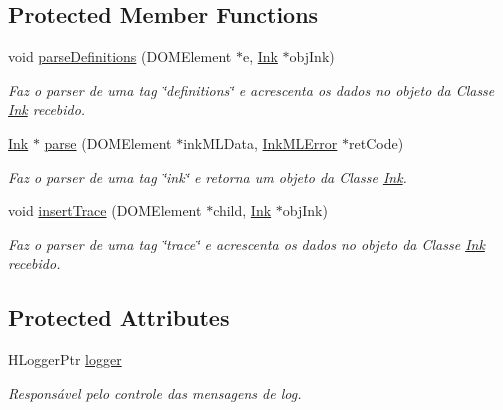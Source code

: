 \subsection*{Protected Member Functions}
\begin{DoxyCompactItemize}
\item 
void \hyperlink{classbr_1_1ufscar_1_1lince_1_1mmi_1_1ink_1_1InkMLParser_afa63df2f41822c11e28762f3c17b1b43}{parseDefinitions} (DOMElement $\ast$e, \hyperlink{classbr_1_1ufscar_1_1lince_1_1mmi_1_1ink_1_1Ink}{Ink} $\ast$objInk)
\begin{DoxyCompactList}\small\item\em Faz o parser de uma tag \char`\"{}definitions\char`\"{} e acrescenta os dados no objeto da Classe \hyperlink{classbr_1_1ufscar_1_1lince_1_1mmi_1_1ink_1_1Ink}{Ink} recebido. \item\end{DoxyCompactList}\item 
\hyperlink{classbr_1_1ufscar_1_1lince_1_1mmi_1_1ink_1_1Ink}{Ink} $\ast$ \hyperlink{classbr_1_1ufscar_1_1lince_1_1mmi_1_1ink_1_1InkMLParser_a77a83c6281e610f692254e0e2e96f956}{parse} (DOMElement $\ast$inkMLData, \hyperlink{namespacebr_1_1ufscar_1_1lince_1_1mmi_1_1ink_a682c285834346cbf7587dd58c9832fe4}{InkMLError} $\ast$retCode)
\begin{DoxyCompactList}\small\item\em Faz o parser de uma tag \char`\"{}ink\char`\"{} e retorna um objeto da Classe \hyperlink{classbr_1_1ufscar_1_1lince_1_1mmi_1_1ink_1_1Ink}{Ink}. \item\end{DoxyCompactList}\item 
void \hyperlink{classbr_1_1ufscar_1_1lince_1_1mmi_1_1ink_1_1InkMLParser_ab2fdfc15cb9334ff037f2e49dd41fe42}{insertTrace} (DOMElement $\ast$child, \hyperlink{classbr_1_1ufscar_1_1lince_1_1mmi_1_1ink_1_1Ink}{Ink} $\ast$objInk)
\begin{DoxyCompactList}\small\item\em Faz o parser de uma tag \char`\"{}trace\char`\"{} e acrescenta os dados no objeto da Classe \hyperlink{classbr_1_1ufscar_1_1lince_1_1mmi_1_1ink_1_1Ink}{Ink} recebido. \item\end{DoxyCompactList}\end{DoxyCompactItemize}
\subsection*{Protected Attributes}
\begin{DoxyCompactItemize}
\item 
HLoggerPtr \hyperlink{classbr_1_1ufscar_1_1lince_1_1mmi_1_1ink_1_1InkMLParser_aab8a422c5f6b431865f0b848b96f5e35}{logger}
\begin{DoxyCompactList}\small\item\em Responsável pelo controle das mensagens de log. \item\end{DoxyCompactList}\end{DoxyCompactItemize}


